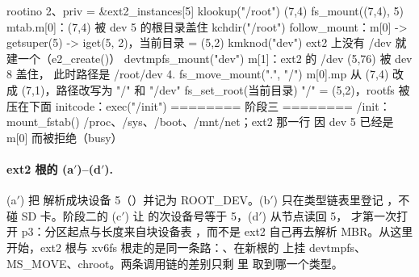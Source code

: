 \begin{txtcode}
                                       rootino 2、priv = &ext2_instances[5]
         klookup("/root")              (7,4)
         fs_mount((7,4), 5)            mtab.m[0]：(7,4) 被 dev 5 的根目录盖住
       kchdir("/root")                 follow_mount：m[0] -> getsuper(5)
                                       -> iget(5, 2)，当前目录 = (5,2)
       kmknod("dev")                   ext2 上没有 /dev 就建一个（e2_create()）
       devtmpfs_mount("dev")           m[1]：ext2 的 /dev (5,76) 被 dev 8 盖住，
                                       此时路径是 /root/dev
    4. fs_move_mount(".", "/")         m[0].mp 从 (7,4) 改成 (7,1)，路径改写为
                                       "/" 和 "/dev"
       fs_set_root(当前目录)           "/" = (5,2)，rootfs 被压在下面
initcode：exec("/init")                ======== 阶段三 ========
  /init：mount_fstab()                 /proc、/sys、/boot、/mnt/net；ext2 那一行
                                       因 dev 5 已经是 m[0] 而被拒绝（busy）
\end{txtcode}

\paragraph{ext2 根的 (a$'$)--(d$'$).} (a$'$) 把  解析成块设备 5（）并记为 ROOT\_DEV。(b$'$)  只在类型链表里登记 ，不碰 SD 卡。阶段二的 (c$'$) 让  的次设备号等于 5，(d$'$)  从节点读回 5， 才第一次打开 p3：分区起点与长度来自块设备表 ，而不是 ext2 自己再去解析 MBR。从这里开始，ext2 根与 xv6fs 根走的是同一条路：、在新根的  上挂 devtmpfs、MS\_MOVE、chroot。两条调用链的差别只剩  里  取到哪一个类型。

